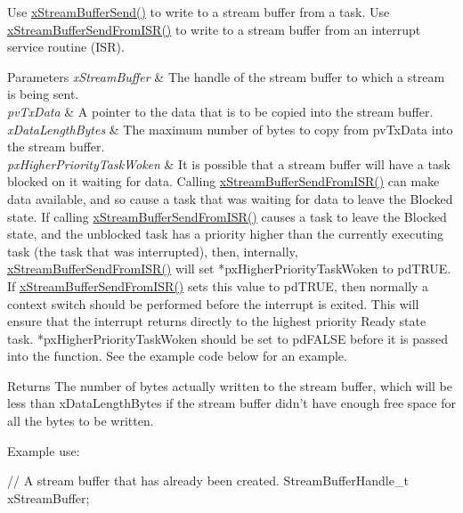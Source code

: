 \begin{DoxyPre}
\begin{DoxyPre}   Use \mbox{\hyperlink{stream__buffer_8h_a35cdf3b6bf677086b9128782f762499d}{xStreamBufferSend()}} to write to a stream buffer from a task.  Use
   \mbox{\hyperlink{stream__buffer_8h_a1dab226e99230e01e79bc2b5c0605e44}{xStreamBufferSendFromISR()}} to write to a stream buffer from an interrupt
   service routine (ISR).\end{DoxyPre}
\end{DoxyPre}



\begin{DoxyPre}
\begin{DoxyPre}
\begin{DoxyParams}{Parameters}
{\em xStreamBuffer} & The handle of the stream buffer to which a stream is
   being sent.\\
\hline
{\em pvTxData} & A pointer to the data that is to be copied into the stream
   buffer.\\
\hline
{\em xDataLengthBytes} & The maximum number of bytes to copy from pvTxData
   into the stream buffer.\\
\hline
{\em pxHigherPriorityTaskWoken} & It is possible that a stream buffer will
   have a task blocked on it waiting for data.  Calling
   \mbox{\hyperlink{stream__buffer_8h_a1dab226e99230e01e79bc2b5c0605e44}{xStreamBufferSendFromISR()}} can make data available, and so cause a task that
   was waiting for data to leave the Blocked state.  If calling
   \mbox{\hyperlink{stream__buffer_8h_a1dab226e99230e01e79bc2b5c0605e44}{xStreamBufferSendFromISR()}} causes a task to leave the Blocked state, and the
   unblocked task has a priority higher than the currently executing task (the
   task that was interrupted), then, internally, \mbox{\hyperlink{stream__buffer_8h_a1dab226e99230e01e79bc2b5c0605e44}{xStreamBufferSendFromISR()}}
   will set *pxHigherPriorityTaskWoken to pdTRUE.  If
   \mbox{\hyperlink{stream__buffer_8h_a1dab226e99230e01e79bc2b5c0605e44}{xStreamBufferSendFromISR()}} sets this value to pdTRUE, then normally a
   context switch should be performed before the interrupt is exited.  This will
   ensure that the interrupt returns directly to the highest priority Ready
   state task.  *pxHigherPriorityTaskWoken should be set to pdFALSE before it
   is passed into the function.  See the example code below for an example.\\
\hline
\end{DoxyParams}
\begin{DoxyReturn}{Returns}
The number of bytes actually written to the stream buffer, which will
   be less than xDataLengthBytes if the stream buffer didn't have enough free
   space for all the bytes to be written.
\end{DoxyReturn}
Example use:

\begin{DoxyPre}
// A stream buffer that has already been created.
StreamBufferHandle\_t xStreamBuffer;\end{DoxyPre}
\end{DoxyPre}
\end{DoxyPre}



